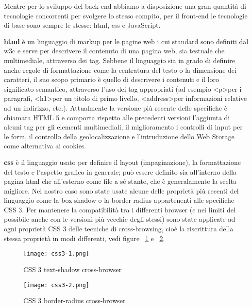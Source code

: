 Mentre per lo sviluppo del back-end abbiamo a disposizione una gran quantità di tecnologie concorrenti per svolgere lo stesso compito, per il front-end le tecnologie di base sono sempre le stesse: \Gls{html}, \Gls{css} e JavaScript.

\textbf{\Gls{html}} \cite{w3c-html} è un linguaggio di markup per le pagine web i cui standard sono definiti dal \Gls{w3c} e serve per descrivere il contenuto di una pagina web, sia testuale che multimediale, attraverso dei tag.
Sebbene il linguaggio sia in grado di definire anche regole di formattazione come la centratura del testo o la dimensione dei caratteri, il suo scopo primario è quello di descrivere i contenuti e il loro significato semantico, attraverso l'uso dei tag appropriati (ad esempio \textless p\textgreater  per i paragrafi, \textless h1\textgreater  per un titolo di primo livello, \textless  address\textgreater  per informazioni relative ad un indirizzo, etc.).
Attualmente la versione più recente delle specifiche è chiamata HTML 5 e comporta rispetto alle precedenti versioni l'aggiunta di alcuni tag per gli elementi multimediali, il miglioramento i controlli di input per le form, il controllo della geolocalizzazione e l'intruduzione dello Web Storage come alternativa ai cookies.

\textbf{\Gls{css}} \cite{w3c-css} è il linguaggio usato per definire il layout (impaginazione), la formattazione del testo e l'aspetto grafico in generale; può essere definito sia all'interno della pagina \Gls{html} che all'esterno come file a sé stante, che è generalamente la scelta migliore.
Nel nostro caso sono state usate alcune delle proprietà più recenti del linguaggio come la box-shadow o la border-radius appartenenti alle specifiche CSS 3.
Per mantenere la compatibilità tra i differenti browser (e nei limiti del possibile anche con le versioni più vecchie degli stessi) sono state applicate ad ogni proprietà CSS 3 delle tecniche di cross-browsing, cioè la riscrittura della stessa proprietà in modi differenti, vedi figure ~\ref{fig:Css3Shadow} e ~\ref{fig:Css3Radius}.

\begin{figure}[H]
    \centering
    \texttt{[image: css3-1.png]}
    \caption{CSS 3 text-shadow cross-browser}
    \label{fig:Css3Shadow}
\end{figure}

\begin{figure}[H]
    \centering
    \texttt{[image: css3-2.png]}
    \caption{CSS 3 border-radius cross-browser}
    \label{fig:Css3Radius}
\end{figure}

